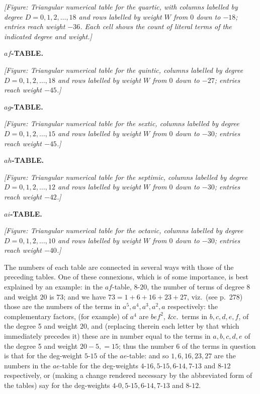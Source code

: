 \documentclass[11pt]{article}
\begin{document}
\textit{[Figure: Triangular numerical table for the quartic, with columns labelled by degree $D = 0, 1, 2, \ldots, 18$ and rows labelled by weight $W$ from $0$ down to $-18$; entries reach weight $-36$. Each cell shows the count of literal terms of the indicated degree and weight.]}

\bigskip
\begin{center}\textbf{$af$-TABLE.}\end{center}

\textit{[Figure: Triangular numerical table for the quintic, columns labelled by degree $D = 0, 1, 2, \ldots, 18$ and rows labelled by weight $W$ from $0$ down to $-27$; entries reach weight $-45$.]}

\bigskip
\begin{center}\textbf{$ag$-TABLE.}\end{center}

\textit{[Figure: Triangular numerical table for the sextic, columns labelled by degree $D = 0, 1, 2, \ldots, 15$ and rows labelled by weight $W$ from $0$ down to $-30$; entries reach weight $-45$.]}

\bigskip
\begin{center}\textbf{$ah$-TABLE.}\end{center}

\textit{[Figure: Triangular numerical table for the septimic, columns labelled by degree $D = 0, 1, 2, \ldots, 12$ and rows labelled by weight $W$ from $0$ down to $-30$; entries reach weight $-42$.]}

\bigskip
\begin{center}\textbf{$ai$-TABLE.}\end{center}

\textit{[Figure: Triangular numerical table for the octavic, columns labelled by degree $D = 0, 1, 2, \ldots, 10$ and rows labelled by weight $W$ from $0$ down to $-30$; entries reach weight $-40$.]}

The numbers of each table are connected in several ways with those of the preceding tables. One of these connexions, which is of some importance, is best explained by an example: in the $af$-table, $8$-$20$, the number of terms of degree 8 and weight $20$ is $73$; and we have $73 = 1 + 6 + 16 + 23 + 27$, viz.\ (see p.~278) those are the numbers of the terms in $a^5, a^4, a^3, a^2, a$ respectively: the complementary factors, (for example) of $a^4$ are $bef^2$, \&c.\ terms in $b, c, d, e, f$, of the degree 5 and weight $20$, and (replacing therein each letter by that which immediately precedes it) these are in number equal to the terms in $a, b, c, d, e$ of the degree 5 and weight $20 - 5, = 15$; thus the number 6 of the terms in question is that for the deg-weight $5$-$15$ of the $ae$-table: and so $1, 6, 16, 23, 27$ are the numbers in the $ae$-table for the deg-weights $4$-$16, 5$-$15, 6$-$14, 7$-$13$ and $8$-$12$ respectively, or (making a change rendered necessary by the abbreviated form of the tables) say for the deg-weights $4$-$0, 5$-$15, 6$-$14, 7$-$13$ and $8$-$12$.
\end{document}
